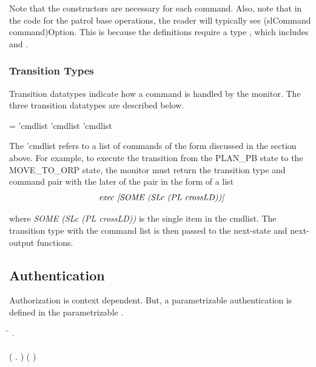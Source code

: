 \documentclass[../../main/main.tex]{subfiles}
\begin{document}
Note that the constructors are necessary for each command. Also, note that in the  code for the patrol base operations, the reader will typically see (slCommand command)Option.  This is because the definitions require a type , which includes   and .




\subsubsection{Transition Types}
Transition datatypes indicate how a command is handled by the monitor.  The three transition datatypes are described below. 

 =  'cmdlist \HOLTokenBar{}  'cmdlist \HOLTokenBar{}  'cmdlist

The 'cmdlist refers to a list of commands of the form discussed in the section above.  For example, to execute the transition from the PLAN_PB state to the MOVE_TO_ORP state, the monitor must return the transition type and command pair with the later of the pair in the form of a list 
\[\text{\textit{exec [SOME (SLc (PL crossLD))]}} \]

where \textit{SOME (SLc (PL crossLD))} is the single item in the cmdlist.  The transition type with the command list is then passed to the next-state and next-output functions.

\subsection{Authentication}
Authorization is context dependent. But, a parametrizable authentication is defined in the parametrizable .

\begin{tabbing}
\parskip=8pt

\HOLTokenTurnstile{} \=\HOLSymConst{\HOLTokenForall{}} . \\
    \>     \HOLSymConst{\HOLTokenEquiv{}} \\
    \>  (\HOLTokenLambda{} .  \HOLSymConst{\HOLTokenConj{}} )  (  )
\parskip=18pt
\end{tabbing}
\end{document}

